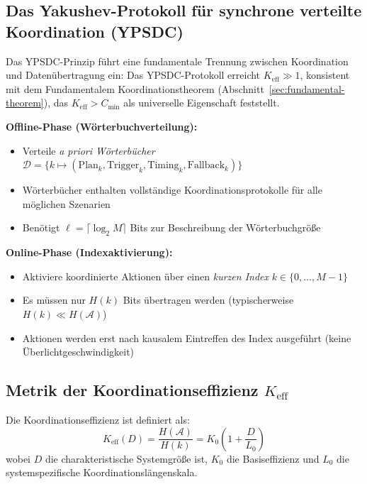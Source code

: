 \documentclass[11pt,a4paper]{article}
\begin{document}
	\subsection{Das Yakushev-Protokoll für synchrone verteilte Koordination (YPSDC)}
	Das YPSDC-Prinzip führt eine fundamentale Trennung zwischen Koordination und Datenübertragung ein:
	Das YPSDC-Protokoll erreicht $K_{\mathrm{eff}} \gg 1$, konsistent mit dem Fundamentalem Koordinationstheorem (Abschnitt~\ref{sec:fundamental-theorem}), das $K_{\mathrm{eff}} > C_{\min}$ als universelle Eigenschaft feststellt.
	\begin{tcolorbox}[title=YPSDC-Prinzip, colback=blue!5!white, colframe=blue!50!black]
		\textbf{Offline-Phase (Wörterbuchverteilung):}
		\begin{itemize}
			\item Verteile \emph{a priori Wörterbücher} $\mathcal{D} = \{k \mapsto (\text{Plan}_k, \text{Trigger}_k, \text{Timing}_k, \text{Fallback}_k)\}$
			\item Wörterbücher enthalten vollständige Koordinationsprotokolle für alle möglichen Szenarien
			\item Benötigt $\ell = \lceil \log_2 M \rceil$ Bits zur Beschreibung der Wörterbuchgröße
		\end{itemize}
		
		\textbf{Online-Phase (Indexaktivierung):}
		\begin{itemize}
			\item Aktiviere koordinierte Aktionen über einen \emph{kurzen Index} $k \in \{0, \dots, M-1\}$
			\item Es müssen nur $H(k)$ Bits übertragen werden (typischerweise $H(k) \ll H(\mathcal{A})$)
			\item Aktionen werden erst nach kausalem Eintreffen des Index ausgeführt (keine Überlichtgeschwindigkeit)
		\end{itemize}
	\end{tcolorbox}
	
	\subsection{Metrik der Koordinationseffizienz \texorpdfstring{$K_{\mathrm{eff}}$}{K_eff}}
	Die Koordinationseffizienz ist definiert als:
	\begin{equation}
		K_{\mathrm{eff}}(D) = \frac{H(\mathcal{A})}{H(k)} = K_0 \left(1 + \frac{D}{L_0}\right)
	\end{equation}
	wobei $D$ die charakteristische Systemgröße ist, $K_0$ die Basiseffizienz und $L_0$ die systemspezifische Koordinationslängenskala.
	
\end{document}
